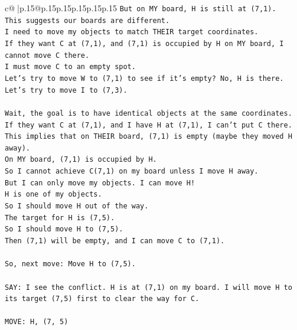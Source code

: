 \documentclass{article}
\begin{document}
{\begin{supertabular}{c@{$\;$}|p{.15\linewidth}@{}p{.15\linewidth}p{.15\linewidth}p{.15\linewidth}p{.15\linewidth}p{.15\linewidth}}
{{{\texttt{But on MY board, H is still at (7,1).} \\
\texttt{This suggests our boards are different.} \\
\texttt{I need to move my objects to match THEIR target coordinates.} \\
\texttt{If they want C at (7,1), and (7,1) is occupied by H on MY board, I cannot move C there.} \\
\texttt{I must move C to an empty spot.} \\
\texttt{Let's try to move W to (7,1) to see if it's empty? No, H is there.} \\
\texttt{Let's try to move I to (7,3).} \\
\\ 
\texttt{Wait, the goal is to have identical objects at the same coordinates.} \\
\texttt{If they want C at (7,1), and I have H at (7,1), I can't put C there.} \\
\texttt{This implies that on THEIR board, (7,1) is empty (maybe they moved H away).} \\
\texttt{On MY board, (7,1) is occupied by H.} \\
\texttt{So I cannot achieve C(7,1) on my board unless I move H away.} \\
\texttt{But I can only move my objects. I can move H!} \\
\texttt{H is one of my objects.} \\
\texttt{So I should move H out of the way.} \\
\texttt{The target for H is (7,5).} \\
\texttt{So I should move H to (7,5).} \\
\texttt{Then (7,1) will be empty, and I can move C to (7,1).} \\
\\ 
\texttt{So, next move: Move H to (7,5).} \\
\\ 
\texttt{SAY: I see the conflict. H is at (7,1) on my board. I will move H to its target (7,5) first to clear the way for C.} \\
\\ 
\texttt{MOVE: H, (7, 5)} \\
            }
        }
    }
     \\ \\


\end{supertabular}}
\end{document}
